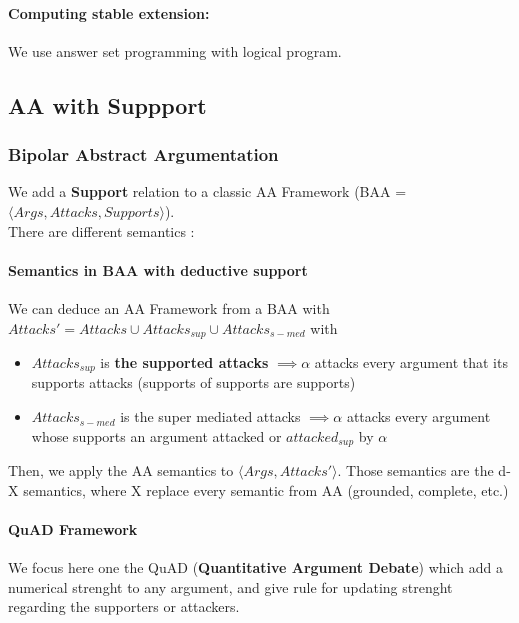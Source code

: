 		\paragraph{Computing stable extension:} We use answer set programming with logical program. 
		

	\subsection{AA with Suppport}

		\subsubsection[BAA]{Bipolar Abstract Argumentation}
			We add a \textbf{Support} relation to a classic AA Framework (BAA = $\langle Args, Attacks, Supports \rangle$). \\There are different semantics :

			\paragraph*{Semantics in BAA with deductive support}
			We can deduce an AA Framework from a BAA with $Attacks' = Attacks \cup Attacks_{sup} \cup Attacks_{s-med}$ with 
			\begin{definition}
				\begin{itemize}
					\item $Attacks_{sup}$ is \textbf{the supported attacks}  $\implies \alpha$ attacks every argument that its supports attacks (supports of supports are supports)
					\item $Attacks_{s-med}$ is the super mediated attacks  $ \implies \alpha$ attacks every argument whose supports an argument attacked or $attacked_{sup}$  by $\alpha$ 
				\end{itemize}
			\end{definition}

			Then, we apply the AA semantics to $\langle Args, Attacks' \rangle$. Those semantics are the d-X semantics, where X replace every semantic from AA (grounded, complete, etc.)
			\paragraph*{QuAD Framework}
			We focus here one the QuAD (\textbf{Quantitative Argument Debate}) which add a numerical strenght to any argument, and give rule for updating strenght regarding the supporters or attackers.
			

